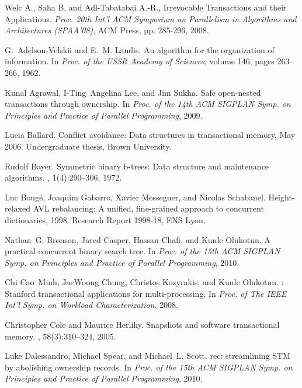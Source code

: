 \begin{thebibliography}{99}
{%
Welc A., Saha B. and Adl-Tabatabai A.-R., 
Irrevocable Transactions and their Applications. 
{\it  Proc. 20th  Int'l  ACM Symposium on Parallelism in Algorithms 
and Architectures   (SPAA'08)},  ACM Press, pp. 285-296,  2008. 


G.~Adelson-Velskii and E.~M. Landis.
\newblock An algorithm for the organization of information.
\newblock In {\em Proc. of the USSR Academy of Sciences}, volume 146, pages
  263--266, 1962.

Kunal Agrawal, I-Ting~Angelina Lee, and Jim Sukha.
\newblock Safe open-nested transactions through ownership.
\newblock In {\em Proc. of the 14th ACM SIGPLAN Symp. on Principles and
  Practice of Parallel Programming}, 2009.

Lucia Ballard.
\newblock Conflict avoidance: Data structures in transactional memory, May
  2006.
\newblock Undergraduate thesis, Brown University.

Rudolf Bayer.
\newblock Symmetric binary b-trees: Data structure and maintenance algorithms.
, 1(4):290--306, 1972.

Luc Boug\'e, Joaquim Gabarro, Xavier Messeguer, and Nicolas Schabanel.
\newblock Height-relaxed {AVL} rebalancing: A unified, fine-grained approach to
  concurrent dictionaries, 1998.
\newblock Research Report 1998-18, ENS Lyon.

Nathan~G. Bronson, Jared Casper, Hassan Chafi, and Kunle Olukotun.
\newblock A practical concurrent binary search tree.
\newblock In {\em Proc. of the 15th ACM SIGPLAN Symp. on Principles and
  Practice of Parallel Programming}, 2010.

Chi Cao~Minh, JaeWoong Chung, Christos Kozyrakis, and Kunle Olukotun.
: Stanford transactional applications for multi-processing.
\newblock In {\em Proc. of The IEEE Int'l Symp. on Workload Characterization},
  2008.

Christopher Cole and Maurice Herlihy.
\newblock Snapshots and software transactional memory.
, 58(3):310--324, 2005.

Luke Dalessandro, Michael Spear, and Michael~L. Scott.
rec: streamlining {STM} by abolishing ownership records.
\newblock In {\em Proc. of the 15th ACM SIGPLAN Symp. on Principles and
  Practice of Parallel Programming}, 2010.

}
\end{thebibliography}
